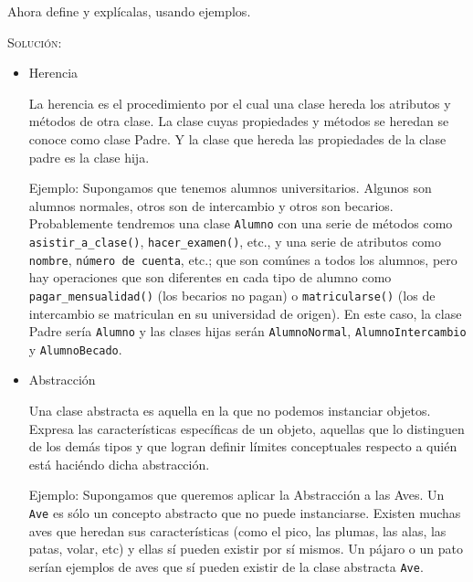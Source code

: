 \documentclass[letterpaper,11pt]{article}
\begin{document}
\begin{enumerate}
    Ahora define y explícalas, usando ejemplos.

    \textsc{Solución:}
    \begin{itemize}
        \item Herencia

        La herencia es el procedimiento por el cual una clase hereda los 
        atributos y métodos de otra clase. La clase cuyas propiedades y métodos 
        se heredan se conoce como clase Padre. Y la clase que hereda las 
        propiedades de la clase padre es la clase hija.

        Ejemplo: Supongamos que tenemos alumnos universitarios. Algunos son 
        alumnos normales, otros son de intercambio y otros son becarios. 
        Probablemente tendremos una clase \texttt{Alumno} con una serie de 
        métodos como \texttt{asistir\_a\_clase()}, \texttt{hacer\_examen()}, 
        etc., y una serie de atributos como \texttt{nombre}, \texttt{número de 
        cuenta}, etc.; que son comúnes a todos los alumnos, pero hay operaciones 
        que son diferentes en cada tipo de alumno como 
        \texttt{pagar\_mensualidad()} (los becarios no pagan) o 
        \texttt{matricularse()} (los de intercambio se matriculan en su 
        universidad de origen). En este caso, la clase Padre sería 
        \texttt{Alumno} y las clases hijas serán \texttt{AlumnoNormal},
        \texttt{AlumnoIntercambio} y \texttt{AlumnoBecado}.

        \item Abstracción

        Una clase abstracta es aquella en la que no podemos instanciar objetos.
        Expresa las características específicas de un objeto, aquellas que lo 
        distinguen de los demás tipos y que logran definir límites conceptuales
        respecto a quién está haciéndo dicha abstracción.

        Ejemplo: Supongamos que queremos aplicar la Abstracción a las Aves. 
        Un \texttt{Ave} es sólo un concepto abstracto que no puede instanciarse.
        Existen muchas aves que heredan sus características (como el pico, las 
        plumas, las alas, las patas, volar, etc) y ellas sí pueden existir 
        por sí mismos. Un pájaro o un pato serían ejemplos de aves que sí 
        pueden existir de la clase abstracta \texttt{Ave}.
    \end{itemize}


\end{enumerate}
\end{document}

